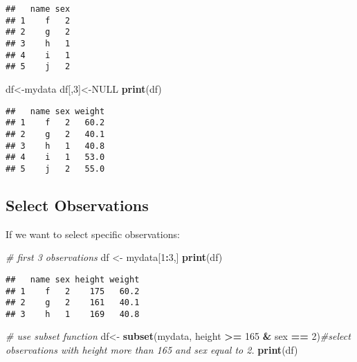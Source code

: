 \documentclass[]{book}
\newenvironment{Shaded}{\begin{snugshade}}{\end{snugshade}}
\newcommand{\KeywordTok}[1]{\textcolor[rgb]{0.13,0.29,0.53}{\textbf{#1}}}
\newcommand{\DecValTok}[1]{\textcolor[rgb]{0.00,0.00,0.81}{#1}}
\newcommand{\StringTok}[1]{\textcolor[rgb]{0.31,0.60,0.02}{#1}}
\newcommand{\CommentTok}[1]{\textcolor[rgb]{0.56,0.35,0.01}{\textit{#1}}}
\newcommand{\OtherTok}[1]{\textcolor[rgb]{0.56,0.35,0.01}{#1}}
\newcommand{\OperatorTok}[1]{\textcolor[rgb]{0.81,0.36,0.00}{\textbf{#1}}}
\newcommand{\NormalTok}[1]{#1}
\theoremstyle{definition}
\theoremstyle{definition}
\theoremstyle{definition}
\theoremstyle{remark}
\begin{document}
\begin{verbatim}
##   name sex
## 1    f   2
## 2    g   2
## 3    h   1
## 4    i   1
## 5    j   2
\end{verbatim}

\begin{Shaded}
\begin{Highlighting}[]
\NormalTok{df<-mydata}
\NormalTok{df[,}\DecValTok{3}\NormalTok{]<-}\OtherTok{NULL}
\KeywordTok{print}\NormalTok{(df)}
\end{Highlighting}
\end{Shaded}

\begin{verbatim}
##   name sex weight
## 1    f   2   60.2
## 2    g   2   40.1
## 3    h   1   40.8
## 4    i   1   53.0
## 5    j   2   55.0
\end{verbatim}

\subsection{Select Observations}\label{select-observations}

If we want to select specific observations:

\begin{Shaded}
\begin{Highlighting}[]
\CommentTok{# first 3 observations}
\NormalTok{df <-}\StringTok{ }\NormalTok{mydata[}\DecValTok{1}\OperatorTok{:}\DecValTok{3}\NormalTok{,]}
\KeywordTok{print}\NormalTok{(df)}
\end{Highlighting}
\end{Shaded}

\begin{verbatim}
##   name sex height weight
## 1    f   2    175   60.2
## 2    g   2    161   40.1
## 3    h   1    169   40.8
\end{verbatim}

\begin{Shaded}
\begin{Highlighting}[]
\CommentTok{# use subset function }
\NormalTok{df<-}\StringTok{ }\KeywordTok{subset}\NormalTok{(mydata, height }\OperatorTok{>=}\StringTok{ }\DecValTok{165} \OperatorTok{&}\StringTok{ }\NormalTok{sex }\OperatorTok{==}\StringTok{ }\DecValTok{2}\NormalTok{)}\CommentTok{#select observations with height more than 165 and sex equal to 2.}
\KeywordTok{print}\NormalTok{(df)}
\end{Highlighting}
\end{Shaded}
\end{document}
